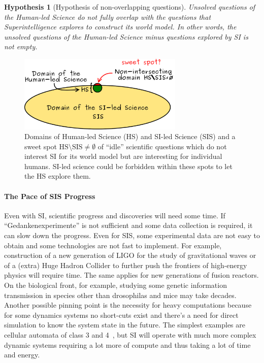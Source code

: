 \documentclass[a4paper,11pt]{article}
\newtheorem{hypothesis}{Hypothesis}
\begin{document}
\begin{hypothesis}[Hypothesis of non-overlapping questions]\label{hyp:SI}
Unsolved questions of the Human-led Science do not fully overlap with the questions that Superintelligence explores to construct its world model. In other words, the unsolved questions of the Human-led Science minus questions explored by SI is not empty.
\end{hypothesis}



\begin{figure}[h!]
    \centering\includegraphics[width=0.7\textwidth]{intersections}
    \caption{\label{fig:intersection}Domains of Human-led Science (HS) and SI-led Science (SIS) and a sweet spot $\text{HS} \setminus \text{SIS} \ne \emptyset$ of ``idle'' scientific questions which do not interest SI for its world model but are interesting for individual humans. SI-led science could be forbidden within these spots to let the HS explore them.}
\end{figure}


\paragraph{The Pace of SIS Progress}

Even with SI, scientific progress and discoveries will need some time. If ``Gedankenexperimente'' is not sufficient and some data collection is required, it can slow down the progress. Even for SIS, some experimental data are not easy to obtain and some technologies are not fast to implement. For example, construction of a new generation of LIGO for the study of gravitational waves  or of a (extra) Huge Hadron Collider to further push the frontiers of high-energy physics will require time. The same applies for new generations of fusion reactors. On the biological front, for example, studying some genetic information transmission in species other than drosophilas and mice may take decades. Another possible pinning point is the necessity for heavy computations because for some dynamics systems no short-cuts exist and there's a need for direct simulation to know the system state in the future. The simplest examples are cellular automata of class 3 and 4~\parencite{Wolfram1984CA}, but SI will operate with much more complex dynamic systems requiring a lot more of compute and thus taking a lot of time and energy.
\end{document}
